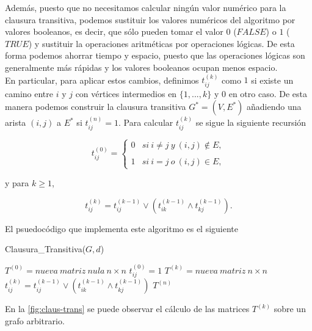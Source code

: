 Además, puesto que no necesitamos calcular ningún valor numérico para la clausura transitiva, podemos sustituir los valores numéricos del algoritmo por valores booleanos, es decir, que sólo pueden tomar el valor $0$ ($FALSE$) o $1$ ($TRUE$) y sustituir la operaciones aritméticas por operaciones lógicas. De esta forma podemos ahorrar tiempo y espacio, puesto que las operaciones lógicas son generalmente más rápidas y los valores booleanos ocupan menos espacio. \\

En particular, para aplicar estos cambios, definimos $t_{ij}^{(k)}$ como $1$ si existe un camino entre $i$ y $j$ con vértices intermedios en $\{1,...,k\}$ y 0 en otro caso. De esta manera podemos construir la clausura transitiva $G^*=(V,E^*)$ añadiendo una arista $(i,j)$ a $E^*$ si $t_{ij}^{(n)}=1$. Para calcular $t_{ij}^{(k)}$ se sigue la siguiente recursión

$$t_{ij}^{(0)}= \left\{ \begin{array}{lcc}
	0 &   si\ i\neq j\ y\ (i,j)\notin E, \\
	\\ 1 & si\ i= j\ o\ (i,j)\in E,
\end{array}
\right.$$

y para $k\geq 1$,

$$t_{ij}^{(k)}=t_{ij}^{(k-1)}\lor (t_{ik}^{(k-1)}\wedge t_{kj}^{(k-1)}).$$

El psuedocódigo que implementa este algoritmo es el siguiente

\begin{breakablealgorithm}
	\caption{Clausura\_Transitiva($G,d$)}
	\begin{algorithmic}[1]
		\State $T^{(0)}=nueva\ matriz\ nula\ n\times n$
					\State $t_{ij}^{(0)}=1$
				\EndIf
			\EndFor
		\EndFor
			\State $T^{(k)}=nueva\ matriz\ n\times n$
					\State $t_{ij}^{(k)}=t_{ij}^{(k-1)}\lor (t_{ik}^{(k-1)}\wedge t_{kj}^{(k-1)})$
				\EndFor
			\EndFor
		\EndFor
		\Return $T^{(n)}$
	\end{algorithmic}
\end{breakablealgorithm}

En la \autoref{fig:claus-trans} se puede observar el cálculo de las matrices $T^{(k)}$ sobre un grafo arbitrario.



\endinput



